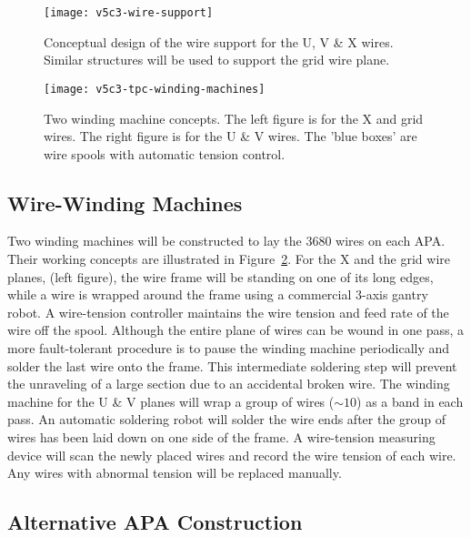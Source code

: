 \begin{figure}[htpb]
\centering
\texttt{[image: v5c3-wire-support]}
\caption[Conceptual design of the wire support for the U, V \& X wires]{Conceptual design of the wire support for the U, V \& X wires.  
Similar structures will be used to support the grid wire plane.}
\label{fig:tpc-wire-support}
\end{figure}

\begin{figure}[htpb]
\centering
\texttt{[image: v5c3-tpc-winding-machines]}
\caption[Two winding machine concepts]{Two winding machine concepts. The left figure is for the X and grid wires.
The right figure is for the U \& V wires.  The 'blue boxes' are wire spools 
with automatic tension control.}
\label{fig:tpc-winding-machine}
\end{figure}

\subsection{Wire-Winding Machines}

Two winding machines will be constructed to lay the 3680 wires on each APA. 
Their working concepts are illustrated in Figure~\ref{fig:tpc-winding-machine}. 
For the X and the grid wire planes, (left figure), the wire frame will be standing on 
one of its long edges, while a wire is wrapped around the frame using a commercial
3-axis gantry robot. A wire-tension controller maintains the wire 
tension and feed rate of the wire off the spool. Although the entire plane of 
wires can be wound in one pass, a more fault-tolerant procedure is to 
pause the winding machine periodically and solder the last wire onto the frame.
This intermediate soldering step will prevent the unraveling of a large section 
due to an accidental broken wire.  
The winding machine for the U \& V planes will wrap a group of wires ($\sim 10$) as a band in each pass.
An automatic soldering robot will solder the wire ends after the group of wires has been laid down on one side of the frame. 
A wire-tension measuring device will scan the newly placed wires and record 
the wire tension of each wire. Any wires with abnormal tension will be 
replaced manually.  

\subsection{Alternative APA Construction}

